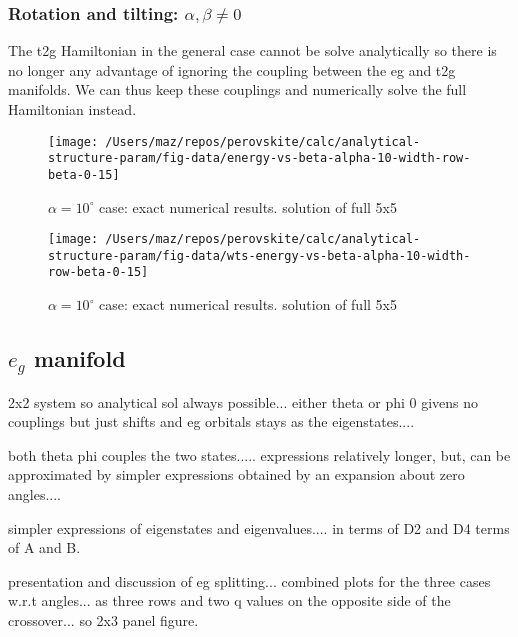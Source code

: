 \documentclass[a4paper,prb]{revtex4-1}  %
\begin{document}
\subsubsection{Rotation and tilting: $\alpha,\beta\neq 0$}


The t2g Hamiltonian in the general case cannot be solve analytically
 so there is no longer any advantage of ignoring the coupling between 
 the eg and t2g manifolds.
We can thus keep these couplings and numerically solve 
the full Hamiltonian instead.




 

\begin{figure}[htbp]
\begin{center}
\texttt{[image: /Users/maz/repos/perovskite/calc/analytical-structure-param/fig-data/energy-vs-beta-alpha-10-width-row-beta-0-15]}
\caption{$\alpha=10^\circ$ case: exact numerical results. solution of full 5x5}
\label{default}
\end{center}
\end{figure}




\begin{figure}[htbp]
\begin{center}
\texttt{[image: /Users/maz/repos/perovskite/calc/analytical-structure-param/fig-data/wts-energy-vs-beta-alpha-10-width-row-beta-0-15]}
\caption{$\alpha=10^\circ$ case: exact numerical results. solution of full 5x5}
\label{default}
\end{center}
\end{figure}




\subsection{$e_{g}$ manifold}



2x2 system so analytical sol always possible...
either theta or phi 0 givens no couplings but just shifts and eg orbitals stays as the eigenstates....

both theta phi couples the two states..... expressions relatively longer, but, can be approximated by simpler expressions obtained by an expansion about zero angles.... 

simpler expressions of eigenstates and eigenvalues.... in terms of D2 and D4 terms of A and B.


presentation and discussion of eg splitting...
combined plots for the three cases w.r.t  angles... as three  rows
and two q values on the opposite side of the crossover...
so 2x3 panel figure.
\end{document}
